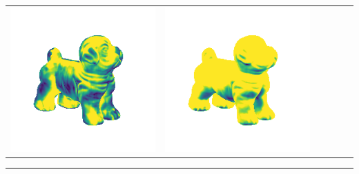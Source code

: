 \begin{center}
\begin{tabularx}{\linewidth}{@{}Y@{}Y@{}Y@{}Y@{}Y@{}Y@{}}
\includegraphics[width=\linewidth]{semisynthetic/20160617_17_marrnet_err.png} &
\includegraphics[width=\linewidth]{semisynthetic/20160617_17_ef_err.png} \\
\end{tabularx}
\begin{center}\rule{0.5\linewidth}{\linethickness}\end{center}


\end{center}
